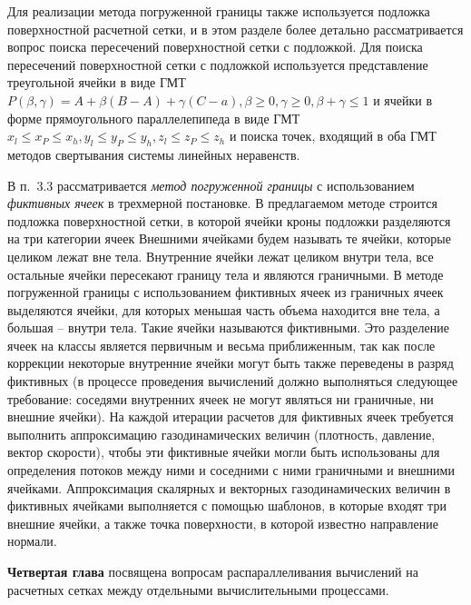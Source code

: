 \documentclass[a4paper,14pt]{extarticle}                     %
\theoremstyle{plain}                                         %
\begin{document}
Для реализации метода погруженной границы также используется подложка поверхностной расчетной сетки, и в этом разделе более детально рассматривается вопрос поиска пересечений поверхностной сетки с подложкой.
Для поиска пересечений поверхностной сетки с подложкой используется представление треугольной ячейки в виде ГМТ $P(\beta, \gamma) = A + \beta (B - A) + \gamma (C - a), \beta \ge 0, \gamma \ge 0, \beta + \gamma \le 1$ и ячейки в форме прямоугольного параллелепипеда в виде ГМТ $x_l \le x_P \le x_h, y_l \le y_P \le y_h, z_l \le z_P \le z_h$ и поиска точек, входящий в оба ГМТ методов свертывания системы линейных неравенств.


В п.~3.3 рассматривается \textit{метод погруженной границы} с использованием \textit{фиктивных ячеек} в трехмерной постановке.
В предлагаемом методе строится подложка поверхностной сетки, в которой ячейки кроны подложки разделяются на три категории ячеек 
Внешними ячейками будем называть те ячейки, которые целиком лежат вне тела.
Внутренние ячейки лежат целиком внутри тела, все остальные ячейки пересекают границу тела и являются граничными.
В методе погруженной границы с использованием фиктивных ячеек из граничных ячеек выделяются ячейки, для которых меньшая часть объема находится вне тела, а большая -- внутри тела.
Такие ячейки называются фиктивными.
Это разделение ячеек на классы является первичным и весьма приближенным, так как после коррекции некоторые внутренние ячейки могут быть также переведены в разряд фиктивных (в процессе проведения вычислений должно выполняться следующее требование: соседями внутренних ячеек не могут являться ни граничные, ни внешние ячейки).
На каждой итерации расчетов для фиктивных ячеек требуется выполнить аппроксимацию газодинамических величин (плотность, давление, вектор скорости), чтобы эти фиктивные ячейки могли быть использованы для определения потоков между ними и соседними с ними граничными и внешними ячейками.
Аппроксимация скалярных и векторных газодинамических величин в фиктивных ячейками выполняется с помощью шаблонов, в которые входят три внешние ячейки, а также точка поверхности, в которой известно направление нормали.


\newpage
\textbf{Четвертая глава} посвящена вопросам распараллеливания вычислений на расчетных сетках между отдельными вычислительными процессами.
\end{document}
